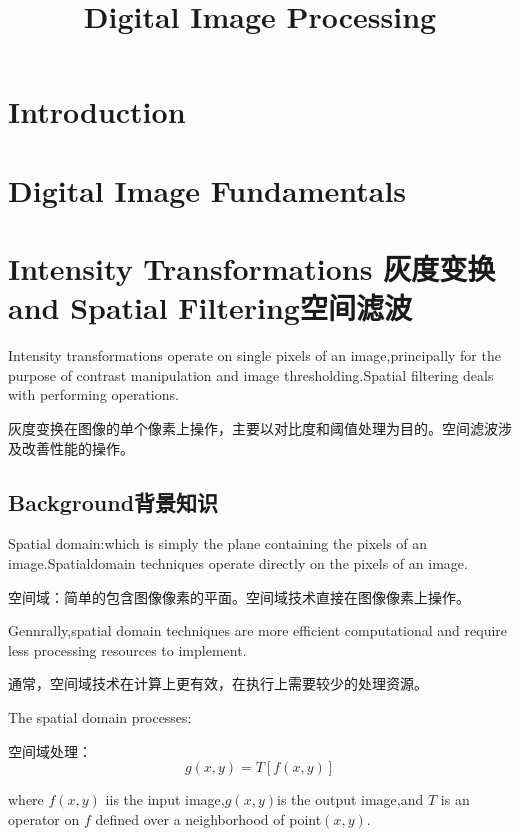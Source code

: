 \documentclass[a4paper,12pt]{article}
\title{Digital Image Processing}
\numberwithin{equation}{section}%
\begin{document}
\maketitle
\tableofcontents%
\section{Introduction}
\section{Digital Image Fundamentals}
\section{Intensity Transformations 灰度变换 and Spatial Filtering空间滤波}

Intensity transformations operate on single pixels of an
image,principally for the purpose of contrast manipulation and image thresholding.Spatial filtering deals with performing operations.

灰度变换在图像的单个像素上操作，主要以对比度和阈值处理为目的。空间滤波涉及改善性能的操作。
\subsection{Background背景知识}

Spatial domain:which is simply the plane containing the pixels of an image.Spatialdomain techniques operate directly on the pixels of an image. 

空间域：简单的包含图像像素的平面。空间域技术直接在图像像素上操作。

Gennrally,spatial domain techniques are more efficient computational and require less processing resources to implement.

通常，空间域技术在计算上更有效，在执行上需要较少的处理资源。

The spatial domain processes:

空间域处理：
\begin{equation} \label{3.1}  %
g(x,y)=T[f(x,y)]
\end{equation}

 where $f(x,y)$ iis the input image,$g(x,y)$is the output image,and $T$ is an operator on $f$ defined over a neighborhood of point$(x,y)$.
\end{document}

